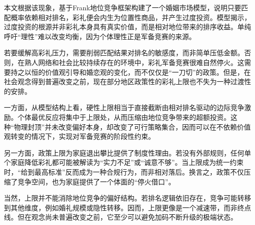 \documentclass[11pt, a4paper, UTF8]{chinese-erj}
\begin{document}
本文根据该现象，基于Frank地位竞争框架构建了一个婚姻市场模型，说明只要匹配概率依赖相对排名，彩礼便会内生为位置性商品，并产生过度投资。模型揭示，过度投资的根源并非彩礼本身具有真实价值，而是相对地位带来的排序收益。单纯呼吁“理性”难以改变均衡，因为个体理性正是军备竞赛的来源。

若要缓解高彩礼压力，需要削弱匹配结果对排名的敏感度，而非简单压低金额。否则，在熟人网络和社会比较持续存在的环境中，彩礼军备竞赛很难自然停火。这需要持之以恒的价值观引导和婚恋观的变化，而不仅仅是“一刀切”的政策。但是，在社会观念得到普遍改变之前，现在部分地区政策性的彩礼上限也不失为一种过渡性的安排。

一方面，从模型结构上看，硬性上限相当于直接截断由相对排名驱动的边际竞争激励。个体最优反应将集中于上限处，从而压缩由地位竞争带来的超额投资。这种“物理封顶”并未改变偏好本身，却改变了可行策略集合，因而可以在不依赖价值观转变的情况下，实现对军备竞赛的阶段性约束。

另一方面，政策上限为家庭退出攀比提供了制度性理由。若没有外部规则，任何单个家庭降低彩礼都可能被解读为“实力不足”或“诚意不够”。当上限成为统一约束时，“给到最高标准”反而成为一种合规行为，而非相对落后。换言之，政策不仅压缩了竞争空间，也为家庭提供了一个体面的“停火借口”。

当然，上限并不能消除地位竞争的偏好结构。若排名逻辑依旧存在，竞争可能转移到其他维度，例如婚礼规模或隐性转移。因而，上限更像是一个减速带，而非终点线。但在观念尚未普遍改变之前，它至少可以避免加码不断升级的极端状态。

\erjref
\printbibliography[heading=none]
\end{document}
